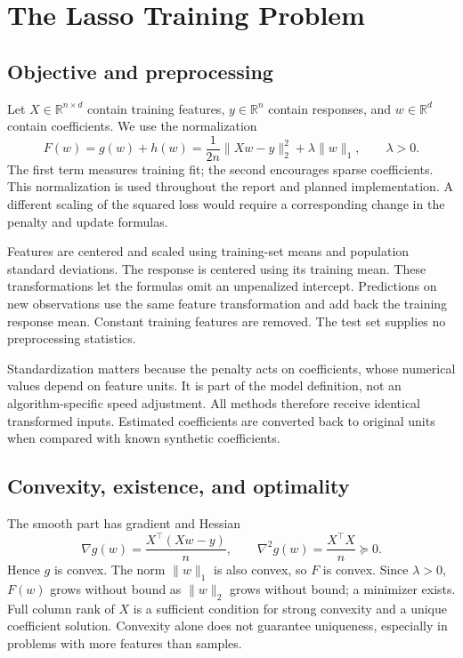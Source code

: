 \documentclass[11pt,a4paper]{article}
\newcommand{\R}{\mathbb{R}}
\begin{document}
\section{The Lasso Training Problem}
\subsection{Objective and preprocessing}
Let $X\in\R^{n\times d}$ contain training features, $y\in\R^n$ contain responses, and $w\in\R^d$ contain coefficients. We use the normalization
\begin{equation}
 F(w)=g(w)+h(w)
 =\frac{1}{2n}\|Xw-y\|_2^2+\lambda\|w\|_1,\qquad\lambda>0.
 \label{eq:objective}
\end{equation}
The first term measures training fit; the second encourages sparse coefficients. This normalization is used throughout the report and planned implementation. A different scaling of the squared loss would require a corresponding change in the penalty and update formulas.

Features are centered and scaled using training-set means and population standard deviations. The response is centered using its training mean. These transformations let the formulas omit an unpenalized intercept. Predictions on new observations use the same feature transformation and add back the training response mean. Constant training features are removed. The test set supplies no preprocessing statistics.

Standardization matters because the penalty acts on coefficients, whose numerical values depend on feature units. It is part of the model definition, not an algorithm-specific speed adjustment. All methods therefore receive identical transformed inputs. Estimated coefficients are converted back to original units when compared with known synthetic coefficients.

\subsection{Convexity, existence, and optimality}
The smooth part has gradient and Hessian
\begin{equation}
\nabla g(w)=\frac{X^\top(Xw-y)}{n},
\qquad \nabla^2g(w)=\frac{X^\top X}{n}\succeq0.
\label{eq:gradient}
\end{equation}
Hence $g$ is convex. The norm $\|w\|_1$ is also convex, so $F$ is convex. Since $\lambda>0$, $F(w)$ grows without bound as $\|w\|_2$ grows without bound; a minimizer exists. Full column rank of $X$ is a sufficient condition for strong convexity and a unique coefficient solution. Convexity alone does not guarantee uniqueness, especially in problems with more features than samples.
\end{document}
